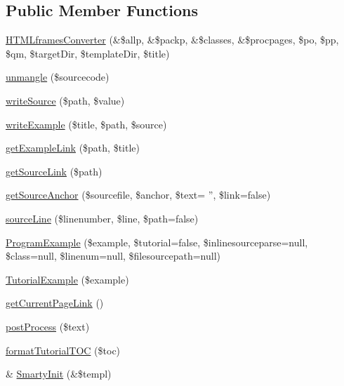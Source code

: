 \subsection*{\-Public \-Member \-Functions}
\begin{DoxyCompactItemize}
\item 
\hyperlink{class_h_t_m_lframes_converter_ab2ec7e0da8318dbe8b6ff8a91defe5e7}{\-H\-T\-M\-Lframes\-Converter} (\&\$allp, \&\$packp, \&\$classes, \&\$procpages, \$po, \$pp, \$qm, \$target\-Dir, \$template\-Dir, \$title)
\item 
\hyperlink{class_h_t_m_lframes_converter_ab36840588a8c62493031b9f23c4918c5}{unmangle} (\$sourcecode)
\item 
\hyperlink{class_h_t_m_lframes_converter_abd54588ec4cf2a0c5d087031485f932e}{write\-Source} (\$path, \$value)
\item 
\hyperlink{class_h_t_m_lframes_converter_a757f70385404e298a4c053d6b7d1be28}{write\-Example} (\$title, \$path, \$source)
\item 
\hyperlink{class_h_t_m_lframes_converter_a26b4615e9204cd081dd51fd0367bf4d6}{get\-Example\-Link} (\$path, \$title)
\item 
\hyperlink{class_h_t_m_lframes_converter_a606ad911462a36f943313ed5475db5dc}{get\-Source\-Link} (\$path)
\item 
\hyperlink{class_h_t_m_lframes_converter_a0cc7c24f111109ea1d8559681ecd6b77}{get\-Source\-Anchor} (\$sourcefile, \$anchor, \$text= '', \$link=false)
\item 
\hyperlink{class_h_t_m_lframes_converter_a14f6bc6e9d8bbe09c506108e657b6f87}{source\-Line} (\$linenumber, \$line, \$path=false)
\item 
\hyperlink{class_h_t_m_lframes_converter_a50aa5ec756e883826c3c06cf65ce61a5}{\-Program\-Example} (\$example, \$tutorial=false, \$inlinesourceparse=null, \$class=null, \$linenum=null, \$filesourcepath=null)
\item 
\hyperlink{class_h_t_m_lframes_converter_aeb023df705aa419245272dd0face61ed}{\-Tutorial\-Example} (\$example)
\item 
\hyperlink{class_h_t_m_lframes_converter_a37cda5b82aee3c5062d29b829345ef7e}{get\-Current\-Page\-Link} ()
\item 
\hyperlink{class_h_t_m_lframes_converter_a0b2058070d303b4d06535be248b021ab}{post\-Process} (\$text)
\item 
\hyperlink{class_h_t_m_lframes_converter_a8207fcf7f5bfbbc02a865ef39b03921a}{format\-Tutorial\-T\-O\-C} (\$toc)
\item 
\& \hyperlink{class_h_t_m_lframes_converter_a7ed01c3315cd29f50a08d695548da9ae}{\-Smarty\-Init} (\&\$templ)

\end{DoxyCompactItemize}
